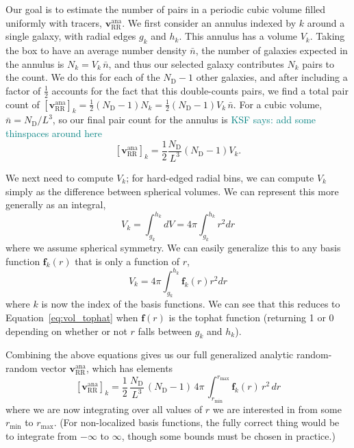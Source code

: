 \documentclass[modern]{aastex62}
\newcommand{\bld}[1]{\bm{#1}} %
\newcommand{\vv}[1]{\bld{v}_\mathrm{#1}}
\newcommand{\ff}{\bld{f}}
\newcommand{\NN}[1]{N_\mathrm{#1}}
\newcommand{\KSF}[1]{\textcolor{teal}{KSF says: #1}}
\begin{document}
Our goal is to estimate the number of pairs in a periodic cubic volume filled uniformly with tracers, $\vv{RR}^\mathrm{ana}$. 
We first consider an annulus indexed by $k$ around a single galaxy, with radial edges $g_k$ and $h_k$. 
This annulus has a volume $V_k$.
Taking the box to have an average number density $\bar{n}$, the number of galaxies expected in the annulus is $N_k = V_k \, \bar{n}$, and thus our selected galaxy contributes $N_k$ pairs to the count.   
We do this for each of the $\NN{D}-1$ other galaxies, and after including a factor of $\frac{1}{2}$ accounts for the fact that this double-counts pairs, we find a total pair count of $\left[ \vv{RR}^\mathrm{ana} \right]_k = \frac{1}{2}(\NN{D}-1) N_k = \frac{1}{2}(\NN{D}-1) V_k \, \bar{n}$.
For a cubic volume, $\bar{n} = \NN{D}/L^3$, so our final pair count for the annulus is 
\KSF{add some thinspaces around here}
\begin{equation}
\left[ \vv{RR}^\mathrm{ana} \right]_k = \frac{1}{2} \frac{\NN{D}}{L^3} (\NN{D}-1) V_k.
\end{equation}

We next need to compute $V_k$; for hard-edged radial bins, we can compute $V_k$ simply as the difference between spherical volumes. 
We can represent this more generally as an integral,
\begin{equation} \label{eq:vol_tophat}
V_k = \int_{g_k}^{h_k} dV = 4\pi \int_{g_k}^{h_k} r^2 dr
\end{equation}
where we assume spherical symmetry.
We can easily generalize this to any basis function $\ff_k(r)$ that is only a function of $r$,
\begin{equation}
V_k = 4\pi  \int_{g_k}^{h_k} \ff_k(r) r^2 dr
\end{equation}
where $k$ is now the index of the basis functions.
We can see that this reduces to Equation~\ref{eq:vol_tophat} when $\ff(r)$ is the tophat function (returning 1 or 0 depending on whether or not $r$ falls between $g_k$ and $h_k$).

Combining the above equations gives us our full generalized analytic random-random vector $\vv{RR}^\mathrm{ana}$, which has elements
\begin{equation}
\left[ \vv{RR}^\mathrm{ana} \right]_k = \frac{1}{2} \, \frac{\NN{D}}{L^3} \,(\NN{D}-1) \, 4\pi \, \int_{r_\mathrm{min}}^{r_\mathrm{max}} \ff_k(r) \, r^2 \, dr
\end{equation}
where we are now integrating over all values of $r$ we are interested in from some $r_\mathrm{min}$ to $r_\mathrm{max}$.
(For non-localized basis functions, the fully correct thing would be to integrate from $-\infty$ to $\infty$, though some bounds must be chosen in practice.)
\end{document}
